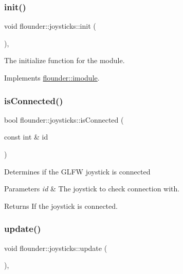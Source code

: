 \subsubsection{\texorpdfstring{init()}{init()}}
{\footnotesize\ttfamily void flounder\+::joysticks\+::init (\begin{DoxyParamCaption}{ }\end{DoxyParamCaption})\hspace{0.3cm}{\ttfamily [override]}, {\ttfamily [virtual]}}



The initialize function for the module. 



Implements \hyperlink{classflounder_1_1imodule_a1725ef346952884d0741de61aba1e0c7}{flounder\+::imodule}.

\mbox{\label{classflounder_1_1joysticks_a5474ad44039f8b1bdcd73a268d09e7f2}} 
\subsubsection{\texorpdfstring{is\+Connected()}{isConnected()}}
{\footnotesize\ttfamily bool flounder\+::joysticks\+::is\+Connected (\begin{DoxyParamCaption}\item[{const int \&}]{id }\end{DoxyParamCaption})}



Determines if the G\+L\+FW joystick is connected 


\begin{DoxyParams}{Parameters}
{\em id} & The joystick to check connection with. \\
\hline
\end{DoxyParams}
\begin{DoxyReturn}{Returns}
If the joystick is connected. 
\end{DoxyReturn}
\mbox{\label{classflounder_1_1joysticks_a346fc03cae7164d6eb927333d1ae725f}} 
\subsubsection{\texorpdfstring{update()}{update()}}
{\footnotesize\ttfamily void flounder\+::joysticks\+::update (\begin{DoxyParamCaption}{ }\end{DoxyParamCaption})\hspace{0.3cm}{\ttfamily [override]}, {\ttfamily [virtual]}}



